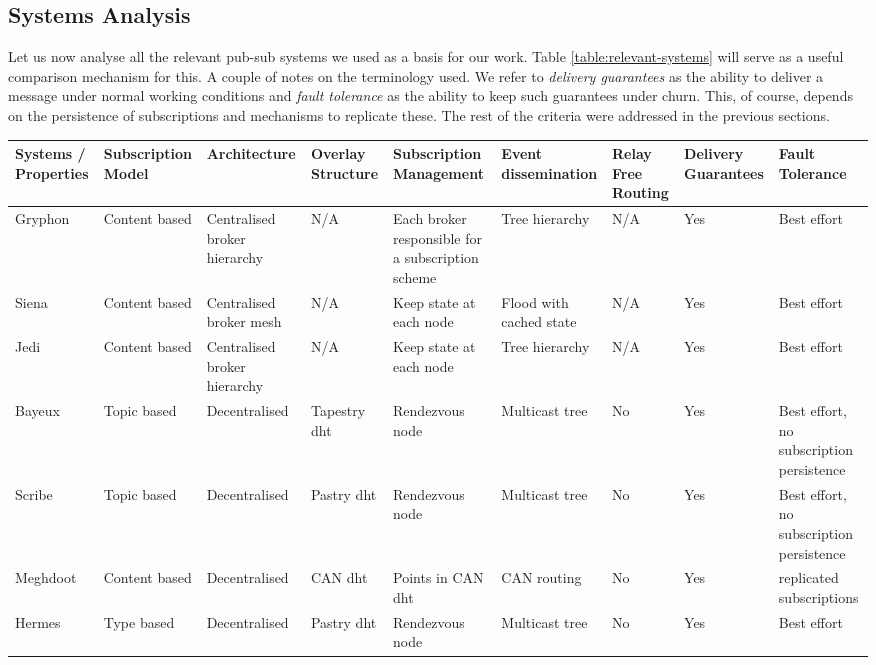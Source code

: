 \subsection{Systems Analysis}\label{systems-overview}

Let us now analyse all the relevant pub-sub systems we used as a basis for our
work. Table \ref{table:relevant-systems} will serve as a useful comparison
mechanism for this.  A couple of notes on the terminology used. We refer to
\emph{delivery guarantees} as the ability to deliver a message under normal
working conditions and \emph{fault tolerance} as the ability to keep such
guarantees under churn. This, of course, depends on the persistence of
subscriptions and mechanisms to replicate these. The rest of the criteria were
addressed in the previous sections.

\begin{table}
  \center
    \begin{tabular}{|P{3cm}|P{2cm}P{2cm}P{2cm}P{2.5cm}P{2cm}P{2cm}P{2cm}P{2cm}|}\hline
    Systems / Properties & Subscription Model & Architecture & Overlay Structure & Subscription Management & Event dissemination & Relay Free Routing & Delivery Guarantees & Fault Tolerance \\\hline
    Gryphon \cite{Strom1998} & Content based & Centralised broker hierarchy & N/A & Each broker responsible for a subscription scheme & Tree hierarchy & N/A & Yes & Best effort \\\hline
    Siena \cite{Carzaniga2003} & Content based & Centralised broker mesh & N/A & Keep state at each node & Flood with cached state & N/A & Yes & Best effort \\\hline
    Jedi \cite{Cugola2001} & Content based & Centralised broker hierarchy & N/A & Keep state at each node & Tree hierarchy & N/A & Yes & Best effort \\\hline
    Bayeux \cite{Zhuang2001} & Topic based & Decentralised & Tapestry \acrshort{dht} & Rendezvous node & Multicast tree & No & Yes & Best effort, no subscription persistence \\\hline
    Scribe \cite{Castro2002} & Topic based & Decentralised & Pastry \acrshort{dht} & Rendezvous node & Multicast tree & No & Yes & Best effort, no subscription persistence \\\hline
    Meghdoot \cite{Gupta2004} & Content based & Decentralised & CAN \acrshort{dht} & Points in CAN \acrshort{dht} & CAN routing  & No & Yes & replicated subscriptions \\\hline
    Hermes \cite{Pietzuch2002} & Type based & Decentralised & Pastry \acrshort{dht} & Rendezvous node & Multicast tree & No & Yes & Best effort \\\hline

\end{tabular}
\end{table}
